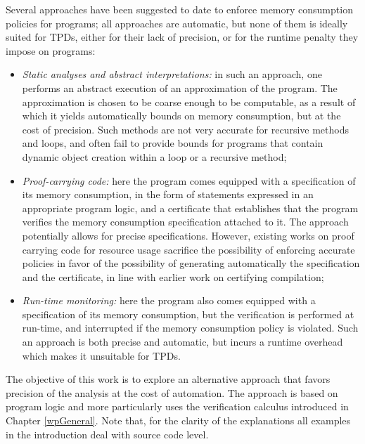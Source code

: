 Several approaches have been suggested to date to enforce memory
consumption policies for programs; all approaches are automatic,
but none of them is ideally suited for TPDs, either for their
lack of precision, or for the runtime penalty they impose on
programs:
\begin{itemize}
\item \emph{Static analyses and abstract interpretations:} in such an
approach, one performs an abstract execution of an approximation of
the program. The approximation is chosen to be coarse enough to be
computable, as a result of which it yields automatically bounds on
memory consumption, but at the cost of precision. Such methods are not
very accurate for recursive methods and loops, and often fail to
provide bounds for programs that contain dynamic object creation
within a loop or a recursive method;


\item \emph{Proof-carrying code:} here the program
comes equipped with a specification of its memory consumption, in the
form of statements expressed in an appropriate program logic, and a
certificate that establishes that the program verifies the memory
consumption specification attached to it. The approach potentially
allows for precise specifications. However, existing works on proof
carrying code for resource usage sacrifice the possibility of
enforcing accurate policies in favor of the possibility of generating
automatically the specification and the certificate, in line with
earlier work on certifying compilation;

\item \emph{Run-time monitoring:}  here the program
also comes equipped with a specification of its memory consumption, 
but the verification is performed at run-time, and interrupted if
the memory consumption policy is violated. Such an approach is both
 precise and automatic, but incurs a runtime overhead which 
makes it unsuitable for TPDs.
\end{itemize}
The objective of this work is to explore an alternative approach that
favors precision of the analysis at the cost of automation. The approach is based on program logic and more particularly uses
the verification calculus introduced in Chapter \ref{wpGeneral}.
Note that,  for the clarity of the explanations all
examples in the introduction deal with source code level.


